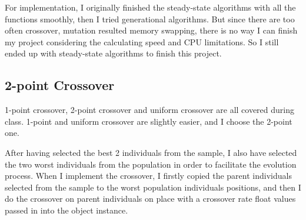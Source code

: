 \documentclass[10pt,b5paper]{article}
\begin{document}
For implementation, I originally finished the steady-state algorithms with all the functions smoothly, then I tried generational algorithms. But since there are too often crossover, mutation resulted memory swapping, there is no way I can finish my project considering the calculating speed and CPU limitations. So I still ended up with steady-state algorithms to finish this project.
\subsection{2-point Crossover}
\label{sec-2-8}
1-point crossover, 2-point crossover and uniform crossover are all covered during class. 1-point and uniform crossover are slightly easier, and I choose the 2-point one.

After having selected the best 2 individuals from the sample, I also have selected the two worst individuals from the population in order to facilitate the evolution process. When I implement the crossover, I firstly copied the parent individuals selected from the sample to the worst population individuals positions, and then I do the crossover on parent individuals on place with a crossover rate float values passed in into the object instance.
\end{document}
